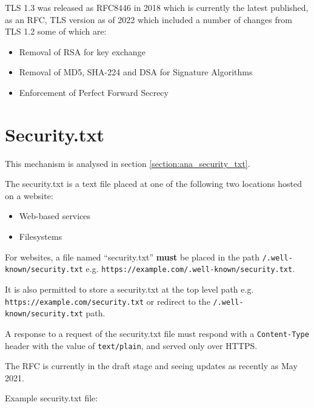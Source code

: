 \documentclass{mscreport}
\begin{document}
\noindent
TLS 1.3 was released as RFC8446 in 2018 \cite{Rescorla2018-wb} which is currently the latest published, as an RFC, TLS version as of 2022 which included a number of changes from TLS 1.2 some of which are:
\begin{itemize}
  \setlength\itemsep{0.1em}
  \item Removal of RSA for key exchange
  \item Removal of MD5, SHA-224 and DSA for Signature Algorithms
  \item Enforcement of Perfect Forward Secrecy
\end{itemize}


\section{Security.txt}
\label{section:bg_security_txt}

This mechanism is analysed in section \ref{section:ana_security_txt}.

\vspace{0.3cm} \noindent
The security.txt is a text file placed at one of the following two locations hosted on a website:

\begin{itemize}
  \item Web-based services
  \item Filesystems
\end{itemize}

\vspace{0.3cm} \noindent
For websites, a file named ``security.txt'' \textbf{must} be placed in the path \texttt{/.well-known/security.txt} e.g. \texttt{https://example.com/.well-known/security.txt}.

\vspace{0.3cm} \noindent
It is also permitted to store a security.txt at the top level path e.g. \texttt{https://example.com/security.txt} or redirect to the \texttt{/.well-known/security.txt} path.

\vspace{0.3cm} \noindent
A response to a request of the security.txt file must respond with a \texttt{Content-Type} header with the value of \texttt{text/plain}, and served only over HTTPS.

\vspace{0.3cm} \noindent
The RFC is currently in the draft stage and seeing updates as recently as May 2021.

\vspace{0.3cm} \noindent
Example security.txt file:
\end{document}
